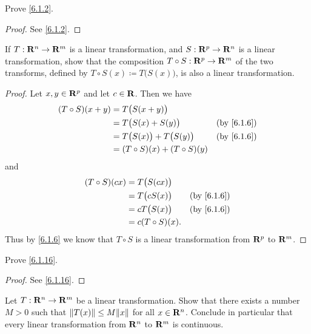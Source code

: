 \exercisesection

\begin{exercise}\label{ex 6.1.1}
  Prove \cref{6.1.2}.
\end{exercise}

\begin{proof}
  See \cref{6.1.2}.
\end{proof}

\begin{exercise}\label{ex 6.1.2}
  If \(T : \mathbf{R}^n \to \mathbf{R}^m\) is a linear transformation, and \(S : \mathbf{R}^p \to \mathbf{R}^n\) is a linear transformation, show that the composition \(T \circ S : \mathbf{R}^p \to \mathbf{R}^m\) of the two transforms, defined by \(T \circ S(x) \coloneqq T\big(S(x)\big)\), is also a linear transformation.
\end{exercise}

\begin{proof}
  Let \(x, y \in \mathbf{R}^p\) and let \(c \in \mathbf{R}\).
  Then we have
  \begin{align*}
    (T \circ S)(x + y) & = T\big(S(x + y)\big)                                          \\
                       & = T\big(S(x) + S(y)\big)            & \text{(by \cref{6.1.6})} \\
                       & = T\big(S(x)\big) + T\big(S(y)\big) & \text{(by \cref{6.1.6})} \\
                       & = (T \circ S)(x) + (T \circ S)(y)
  \end{align*}
  and
  \begin{align*}
    (T \circ S)(cx) & = T\big(S(cx)\big)                             \\
                    & = T\big(c S(x)\big) & \text{(by \cref{6.1.6})} \\
                    & = c T\big(S(x)\big) & \text{(by \cref{6.1.6})} \\
                    & = c (T \circ S)(x).
  \end{align*}
  Thus by \cref{6.1.6} we know that \(T \circ S\) is a linear transformation from \(\mathbf{R}^p\) to \(\mathbf{R}^m\).
\end{proof}

\begin{exercise}\label{ex 6.1.3}
  Prove \cref{6.1.16}.
\end{exercise}

\begin{proof}
  See \cref{6.1.16}.
\end{proof}

\begin{exercise}\label{ex 6.1.4}
  Let \(T : \mathbf{R}^n \to \mathbf{R}^m\) be a linear transformation.
  Show that there exists a number \(M > 0\) such that \(\norm*{T(x)} \leq M \norm*{x}\) for all \(x \in \mathbf{R}^n\).
  Conclude in particular that every linear transformation from \(\mathbf{R}^n\) to \(\mathbf{R}^m\) is continuous.
\end{exercise}

